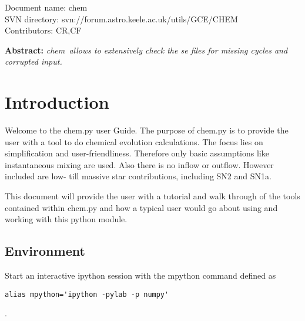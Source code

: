 \renewcommand{\ndoctitle}{Check\textunderscore se.py: Script for checking se output of MESA and NuGrid tools} 
\renewcommand{\ndocname}{chem}                      
\renewcommand{\svndir}{svn://forum.astro.keele.ac.uk/utils/GCE/CHEM}  
\renewcommand{\ndoccontribs}{CR,CF}



Document name: \ndocname \\
SVN directory: \svndir\\
Contributors: \ndoccontribs\\



{  \textbf{Abstract:} \slshape
\ndocname\ allows to extensively check the se files for missing cycles and corrupted input.



\section{Introduction}
\index{\ndocname}
Welcome to the \ndocname.py user Guide. The purpose of \ndocname.py is to 
provide the user with a tool to do chemical evolution calculations.
The focus lies on simplification and user-friendliness. Therefore only basic
assumptions like instantaneous mixing are used.
Also there is no inflow or outflow.
However included are low- till massive star contributions, including
SN2 and SN1a.



This document will provide the user with a 
tutorial and walk through of the tools contained within \ndocname.py and
how a typical user would go about using and working with this python module.

\subsection{Environment}%

Start an interactive ipython session with
the mpython command defined as

\begin{verbatim}
alias mpython='ipython -pylab -p numpy'
\end{verbatim}
.

}
